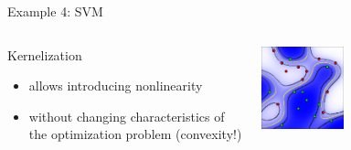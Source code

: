 \begin{vbframe}{Example 4: SVM}
\vspace*{0.2cm}

\begin{columns}[T] %
	\begin{column}{.38\textwidth} 
        Kernelization 
        
        \begin{itemize}
        	\item allows introducing nonlinearity
        	\item without changing characteristics of the optimization problem (convexity!)
        \end{itemize}
	\end{column}
	\begin{column}{.58\textwidth}
		\begin{center}
		    \includegraphics[width=0.4\textwidth]{slides/02-optimization-problems/figure_man/nonlinear-svm-c.pdf}
		\end{center}
	\end{column}

\end{columns}





\end{vbframe}


